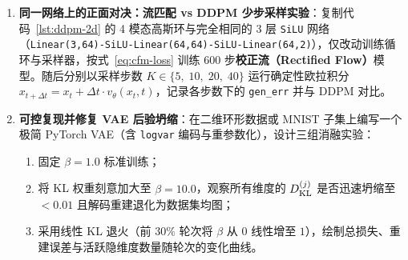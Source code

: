 \begin{enumerate}
  \item[\textbf{5.6.5}] \textbf{同一网络上的正面对决：流匹配 vs DDPM 少步采样实验}：复制代码~\ref{lst:ddpm-2d} 的 4 模态高斯环与完全相同的 3 层 \texttt{SiLU} 网络（\texttt{Linear(3,64)-SiLU-Linear(64,64)-SiLU-Linear(64,2)}），仅改动训练循环与采样器，按式~\eqref{eq:cfm-loss} 训练 600 步\textbf{校正流（Rectified Flow）}模型。随后分别以采样步数 $K \in \{5,\; 10,\; 20,\; 40\}$ 运行确定性欧拉积分 $x_{t+\Delta t} = x_t + \Delta t \cdot v_\theta(x_t, t)$，记录各步数下的 \texttt{gen\_err} 并与 DDPM 对比。

  \item[\textbf{5.6.6}] \textbf{可控复现并修复 VAE 后验坍缩}：在二维环形数据或 MNIST 子集上编写一个极简 PyTorch VAE（含 \texttt{logvar} 编码与重参数化），设计三组消融实验：
  \begin{enumerate}
    \item 固定 $\beta = 1.0$ 标准训练；
    \item 将 KL 权重刻意加大至 $\beta = 10.0$，观察所有维度的 $D_{\mathrm{KL}}^{(j)}$ 是否迅速坍缩至 $< 0.01$ 且解码重建退化为数据集均图；
    \item 采用线性 KL 退火（前 $30\%$ 轮次将 $\beta$ 从 $0$ 线性增至 $1$），绘制总损失、重建误差与活跃隐维度数量随轮次的变化曲线。
  \end{enumerate}
\end{enumerate}


